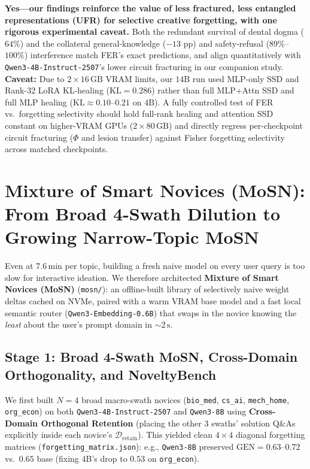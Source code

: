 \documentclass[10.5pt,letterpaper]{article}
\begin{document}
\begin{takeaway}
\textbf{Yes---our findings reinforce the value of less fractured, less entangled representations (UFR) for selective creative forgetting, with one rigorous experimental caveat.} Both the redundant survival of dental dogma ($64\%$) and the collateral general-knowledge ($-13\text{ pp}$) and safety-refusal ($89\%$--$100\%$) interference match FER's exact predictions, and align quantitatively with \texttt{Qwen3-4B-Instruct-2507}'s lower circuit fracturing in our companion study. \textbf{Caveat:} Due to $2\times 16\,\text{GB}$ VRAM limits, our $14\text{B}$ run used MLP-only SSD and Rank-32 LoRA KL-healing ($\text{KL}\!=\!0.286$) rather than full MLP+Attn SSD and full MLP healing ($\text{KL}\!\approx\!0.10\text{--}0.21$ on $4\text{B}$). A fully controlled test of FER vs.\ forgetting selectivity should hold full-rank healing and attention SSD constant on higher-VRAM GPUs ($2\times 80\,\text{GB}$) and directly regress per-checkpoint circuit fracturing ($\Phi$ and lesion transfer) against Fisher forgetting selectivity across matched checkpoints.
\end{takeaway}

\section{Mixture of Smart Novices (MoSN): From Broad 4-Swath Dilution to Growing Narrow-Topic MoSN}

Even at $7.6\,\text{min}$ per topic, building a fresh naive model on every user query is too slow for interactive ideation. We therefore architected \textbf{Mixture of Smart Novices (MoSN)} (\texttt{mosn/}): an offline-built library of selectively naive weight deltas cached on NVMe, paired with a warm VRAM base model and a fast local semantic router (\texttt{Qwen3-Embedding-0.6B}) that swaps in the novice knowing the \emph{least} about the user's prompt domain in $\sim\!2\,\text{s}$.

\subsection{Stage 1: Broad 4-Swath MoSN, Cross-Domain Orthogonality, and NoveltyBench}

We first built $N\!=\!4$ broad macro-swath novices (\texttt{bio\_med}, \texttt{cs\_ai}, \texttt{mech\_home}, \texttt{org\_econ}) on both \texttt{Qwen3-4B-\allowbreak Instruct-2507} and \texttt{Qwen3-8B} using \textbf{Cross-Domain Orthogonal Retention} (placing the other $3$ swaths' solution Q\&As explicitly inside each novice's $\mathcal{D}_{\text{retain}}$). This yielded clean $4\times 4$ diagonal forgetting matrices (\texttt{forgetting\_matrix.json}): e.g., \texttt{Qwen3-8B} preserved $\text{GEN}\!=\!0.63\text{--}0.72$ vs.\ $0.65$ base (fixing 4B's drop to $0.53$ on \texttt{org\_econ}).
\end{document}
